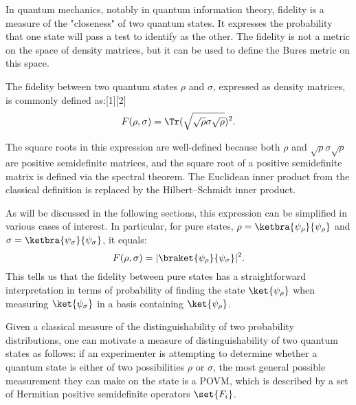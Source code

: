
In quantum mechanics, notably in quantum information theory, fidelity is a measure of the "closeness" of two quantum states. It expresses the probability that one state will pass a test to identify as the other. The fidelity is not a metric on the space of density matrices, but it can be used to define the Bures metric on this space.

\begin{definition}

The fidelity between two quantum states $\rho$ and $\sigma$, expressed as density matrices, is commonly defined as:[1][2]
\begin{equation}
F(\rho, \sigma) = \Tr(\sqrt{\sqrt{\rho}\sigma\sqrt{\rho}})^2.    
\end{equation}
\end{definition}

The square roots in this expression are well-defined because both $\rho$ and $\sqrt{\rho}\sigma\sqrt{\rho}$ are positive semidefinite matrices, and the square root of a positive semidefinite matrix is defined via the spectral theorem. The Euclidean inner product from the classical definition is replaced by the Hilbert–Schmidt inner product.

As will be discussed in the following sections, this expression can be simplified in various cases of interest. In particular, for pure states, $\rho = \ketbra{\psi_\rho}{\psi_\rho}$ and $\sigma = \ketbra{\psi_\sigma}{\psi_\sigma}$, it equals:
\begin{equation}
F(\rho, \sigma) = |\braket{\psi_\rho}{\psi_\sigma}|^{2}.
\end{equation}
This tells us that the fidelity between pure states has a straightforward interpretation in terms of probability of finding the state $\ket{\psi_\rho}$ when measuring $\ket{\psi_\sigma}$ in a basis containing $\ket{\psi_\rho}$.

Given a classical measure of the distinguishability of two probability distributions, one can motivate a measure of distinguishability of two quantum states as follows: if an experimenter is attempting to determine whether a quantum state is either of two possibilities $\rho$ or $\sigma$, the most general possible measurement they can make on the state is a POVM, which is described by a set of Hermitian positive semidefinite operators $\set{F_i}$. 

